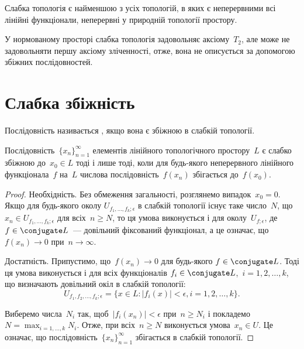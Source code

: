 \begin{remark}
Слабка топологія є найменшою з усіх
топологій, в яких є неперервними всі лінійні функціонали,
неперервні у природній топології простору.
\end{remark}

\begin{remark}
У нормованому просторі слабка
топологія задовольняє аксіому~$T_2$, але може не задовольняти
першу аксіому зліченності, отже, вона не описується за
допомогою збіжних послідовностей.
\end{remark}

\section{Слабка збіжність}

\begin{definition}
Послідовність 
називається ,
якщо вона є збіжною в слабкій топології.
\end{definition}

\begin{lemma}
Послідовність~$\{x_n\}_{n = 1}^\infty$
елементів лінійного топологічного простору~$L$ є слабко збіжною до~$x_0 \in L$ тоді
і лише тоді, коли для будь-якого неперервного лінійного
функціонала~$f$ на~$L$ числова послідовність~$f(x_n)$
збігається до~$f(x_0)$.
\end{lemma}

\begin{proof}
Необхідність. Без обмеження загальності,
розглянемо випадок~$x_0 = 0$. Якщо для будь-якого околу
$U_{f_1, \dots, f_k; \epsilon}$ в слабкій топології існує таке число~$N$, що
$x_n \in U_{f_1, \dots, f_k; \epsilon}$ для всіх~$n \ge N$, то ця умова виконується і для
околу~$U_{f;\epsilon}$, де~$f \in \conjugate L$~--- довільний фіксований функціонал, а
це означає, що~$f(x_n) \to 0$ при~$n \to \infty$.

Достатність. Припустимо, що~$f(x_n) \to 0$ для будь-якого
$f \in \conjugate L$. Тоді ця умова виконується і для всіх функціоналів
$f_i \in \conjugate L$,~$i = 1, 2, \dots, k$, що визначають довільний окіл в слабкій
топології:
\begin{equation*}
    U_{f_1, f_2, \dots, f_k; \epsilon} =
    \{ x \in L: |f_i(x)| < \epsilon, i = 1, 2, \dots, k \}.
\end{equation*}

Виберемо числа~$N_i$ так, щоб~$|f_i(x_n)| < \epsilon$ при~$n \ge N_i$ і
покладемо~$N = \max_{i = 1, \dots, k} N_i$. Отже, при всіх~$n \ge N$ виконується
умова~$x_n \in U$. Це означає, що послідовність~$\{x_n\}_{n = 1}^\infty$
збігається в слабкій топології. 
\end{proof}

